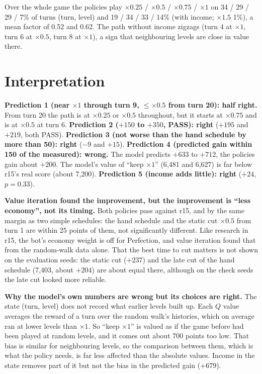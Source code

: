 \documentclass{../polyexp}
\begin{document}
Over the whole game the policies play $\times0.25$ / $\times0.5$ / $\times0.75$ / $\times1$ on 34 / 29 / 29 / 7\% of
turns (turn, level) and 19 / 34 / 33 / 14\% (with income; $\times1.5$ 1\%), a mean factor of 0.52 and 0.62. The path
without income zigzags (turn 4 at $\times1$, turn 6 at $\times0.5$, turn 8 at $\times1$), a sign that neighbouring
levels are close in value there.

\section{Interpretation}
\textbf{Prediction 1 (near $\times1$ through turn 9, $\le\times0.5$ from turn 20): half right.} From turn 20 the
path is at $\times0.25$ or $\times0.5$ throughout, but it starts at $\times0.75$ and is at $\times0.5$ at turn 6.
\textbf{Prediction 2 ($+150$ to $+350$, PASS): right} ($+195$ and $+219$, both PASS).
\textbf{Prediction 3 (not worse than the hand schedule by more than 50): right} ($-9$ and $+15$).
\textbf{Prediction 4 (predicted gain within 150 of the measured): wrong.} The model predicts $+633$ to $+712$, the
policies gain about $+200$. The model's value of ``keep $\times1$'' (6{,}481 and 6{,}627) is far below r15's real score
(about 7{,}200).
\textbf{Prediction 5 (income adds little): right} ($+24$, $p = 0.33$).

\textbf{Value iteration found the improvement, but the improvement is ``less economy'', not its timing.} Both
policies pass against r15, and by the same margin as two simple schedules: the hand schedule and the static cut
$\times0.5$ from turn 1 are within 25 points of them, not significantly different. Like research in r15, the bot's
economy weight is off for Perfection, and value iteration found that from the random-walk data alone. That the
best time to cut matters is not shown on the evaluation seeds: the static cut ($+237$) and the late cut of the hand
schedule (7{,}403, about $+204$) are about equal there, although on the check seeds the late cut looked more reliable.

\textbf{Why the model's own numbers are wrong but its choices are right.} The state (turn, level) does not record
what earlier levels built up. Each $Q$ value averages the reward of a turn over the random walk's histories, which
on average ran at lower levels than $\times1$. So ``keep $\times1$'' is valued as if the game before had been played
at random levels, and it comes out about 700 points too low. That bias is similar for neighbouring levels, so the
comparison between them, which is what the policy needs, is far less affected than the absolute values. Income in
the state removes part of it but not the bias in the predicted gain ($+679$).
\end{document}
